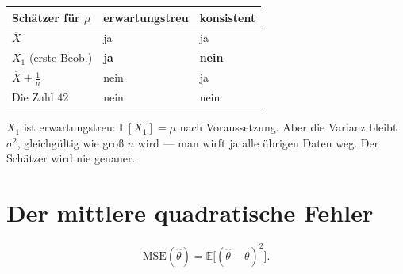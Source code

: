\begin{warnung}
\begin{center}
{\small
\renewcommand{\arraystretch}{1.5}
\begin{tabular}{@{}P{2.8cm}P{2.4cm}P{2.6cm}@{}}
\toprule
\textbf{Schätzer für $\mu$} & \textbf{erwartungstreu} & \textbf{konsistent}\\
\midrule
$\overline X$ & \textcolor{gruen}{ja} & \textcolor{gruen}{ja}\\
$X_1$ (erste Beob.) & \textcolor{gruen}{\textbf{ja}} & \textcolor{akzent}{\textbf{nein}}\\
$\overline X + \frac{1}{n}$ & \textcolor{akzent}{nein} & \textcolor{gruen}{ja}\\
Die Zahl $42$ & \textcolor{akzent}{nein} & \textcolor{akzent}{nein}\\
\bottomrule
\end{tabular}}
\end{center}

$X_1$ ist erwartungstreu: $\mathbb{E}[X_1] = \mu$ nach Voraussetzung. Aber die Varianz bleibt $\sigma^2$, gleichgültig wie groß $n$ wird --- man wirft ja alle übrigen Daten weg. Der Schätzer wird nie genauer.

\begin{center}
\begin{minipage}{0.88\textwidth}
\end{minipage}
\end{center}
\end{warnung}

\section{Der mittlere quadratische Fehler}

\begin{definition}
\[ \mathrm{MSE}(\hat\theta) = \mathbb{E}\bigl[(\hat\theta - \theta)^2\bigr] . \]
\end{definition}

